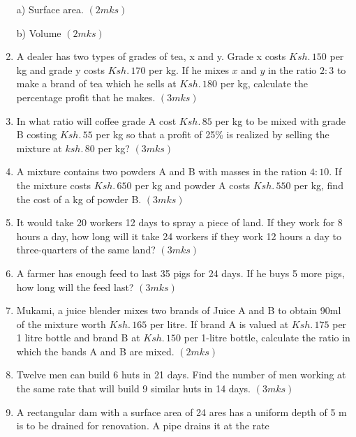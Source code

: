 \documentclass[
  letterpaper,
  DIV=11,
  numbers=noendperiod]{scrreprt}
\begin{document}
\begin{tcolorbox}
\begin{enumerate}
  a) Surface area. \hspace{11 cm} \((2mks)\)

  b) Volume \hspace{12 cm} \((2mks)\)
\item
  A dealer has two types of grades of tea, x and y. Grade x costs
  \(Ksh.\, 150\) per kg and grade y costs \(Ksh.\, 170\) per kg. If he
  mixes \(x\) and \(y\) in the ratio \(2:3\) to make a brand of tea
  which he sells at \(Ksh.\, 180\) per kg, calculate the percentage
  profit that he makes.\hspace{2.5cm} \((3 mks)\)
\item
  In what ratio will coffee grade A cost \(Ksh.\, 85\) per kg to be
  mixed with grade B costing \(Ksh.\,55\) per kg so that a profit of
  25\% is realized by selling the mixture at \(ksh.\,80\) per kg?
  \hspace{14.2cm} \((3mks)\)
\item
  A mixture contains two powders A and B with masses in the ration
  \(4: 10\). If the mixture costs \(Ksh.\, 650\) per kg and powder A
  costs \(Ksh. \,550\) per kg, find the cost of a kg of powder B.
  \hspace{14.1 cm} \((3 mks)\)
\item
  It would take 20 workers 12 days to spray a piece of land. If they
  work for 8 hours a day, how long will it take 24 workers if they work
  12 hours a day to three-quarters of the same land? \hspace{14.3cm}
  \((3mks)\)
\item
  A farmer has enough feed to last 35 pigs for 24 days. If he buys 5
  more pigs, how long will the feed last? \hspace{12.5 cm} \((3mks)\)
\item
  Mukami, a juice blender mixes two brands of Juice A and B to obtain
  90ml of the mixture worth \(Ksh.\, 165\) per litre. If brand A is
  valued at \(Ksh.\, 175\) per 1 litre bottle and brand B at
  \(Ksh.\, 150\) per 1-litre bottle, calculate the ratio in which the
  bands A and B are mixed.\hspace{3cm} \((2mks)\)
\item
  Twelve men can build 6 huts in 21 days. Find the number of men working
  at the same rate that will build 9 similar huts in 14 days.
  \hspace{8.5cm} \((3mks)\)
\item
  A rectangular dam with a surface area of 24 ares has a uniform depth
  of 5 m is to be drained for renovation. A pipe drains it at the rate

\end{enumerate}
\end{tcolorbox}
\end{document}
